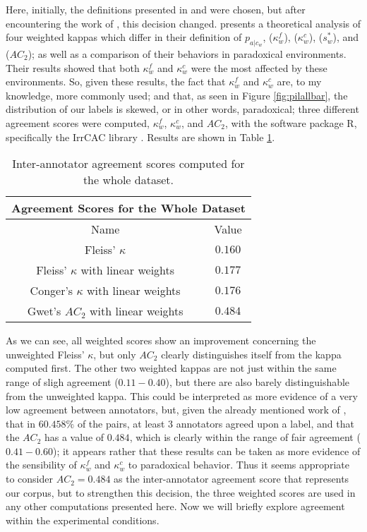 Here, initially, the definitions presented in \citet{warrens2012equivalences} and \citet{warrens2014corrected} were chosen, but after encountering the work of \citet{vanacore2022robustness}, this decision changed. \citet{vanacore2022robustness} presents a theoretical analysis of four weighted kappas which differ in their definition of $p_{a|c_w}$, \citet{fleiss1971measuring} ($\kappa^{f}_{w}$), \citet{conger1980integration} ($\kappa^{c}_{w}$), \citet{brennan1981coefficient} ($s^{*}_{w}$), and \citet{gwet2008computing} ($AC_2$); as well as a comparison of their behaviors in paradoxical environments. Their results showed that both $\kappa^{f}_{w}$ and $\kappa^{c}_{w}$ were the most affected by these environments. So, given these results, the fact that $\kappa^{f}_{w}$ and $\kappa^{c}_{w}$ are, to my knowledge, more commonly used; and that, as seen in Figure \ref{fig:pilallbar}, the distribution of our labels is skewed, or in other words, paradoxical; three different agreement scores were computed, $\kappa^{f}_{w}$, $\kappa^{c}_{w}$, and $AC_2$, with the software package R, specifically the IrrCAC library \citep{gwet2019irrcac}. Results are shown in Table \ref{tab:iaa}.\\

\begin{table}
\centering
\begin{tabular}{|c|c|}
\hline
\multicolumn{2}{|c|}{Agreement Scores for the Whole Dataset}\\\hline
Name & Value \\\hline
Fleiss' $\kappa$ & $0.160$\\\hline
Fleiss' $\kappa$ with linear weights & $0.177$\\\hline
Conger's $\kappa$ with linear weights & $0.176$\\\hline
Gwet's $AC_2$ with linear weights & $0.484$\\\hline
\end{tabular}
\caption{Inter-annotator agreement scores computed for the whole dataset.}
\label{tab:iaa}
\end{table}

As we can see, all weighted scores show an improvement concerning the unweighted Fleiss' $\kappa$, but only $AC_2$ clearly distinguishes itself from the kappa computed first. The other two weighted kappas are not just within the same range of sligh agreement ($0.11-0.40$), but there are also barely distinguishable from the unweighted kappa. This could be interpreted as more evidence of a very low agreement between annotators, but, given the already mentioned work of \citet{vanacore2022robustness}, that in $60.458\%$ of the pairs, at least 3 annotators agreed upon a label, and that the $AC_2$ has a value of $0.484$, which is clearly within the range of fair agreement ($0.41-0.60$); it appears rather that these results can be taken as more evidence of the sensibility of $\kappa^{f}_{w}$ and $\kappa^{c}_{w}$ to paradoxical behavior. Thus it seems appropriate to consider $AC_2=0.484$ as the inter-annotator agreement score that represents our corpus, but to strengthen this decision, the three weighted scores are used in any other computations presented here. Now we will briefly explore agreement within the experimental conditions.\\

